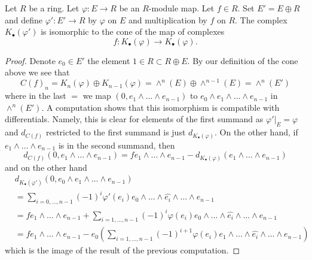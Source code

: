 \begin{lemma}
\label{lemma-cone-koszul-abstract}
Let $R$ be a ring. Let $\varphi : E \to R$ be an $R$-module map.
Let $f \in R$. Set $E' = E \oplus R$ and define $\varphi' : E' \to R$
by $\varphi$ on $E$ and multiplication by $f$ on $R$.
The complex $K_\bullet(\varphi')$ is isomorphic to the
cone of the map of complexes
$$
f :
K_\bullet(\varphi)
\longrightarrow
K_\bullet(\varphi).
$$
\end{lemma}

\begin{proof}
Denote $e_0 \in E'$ the element $1 \in R \subset R \oplus E$.
By our definition of the cone above we see that
$$
C(f)_n = K_n(\varphi) \oplus K_{n - 1}(\varphi) =
\wedge^n(E) \oplus \wedge^{n - 1}(E) = \wedge^n(E')
$$
where in the last $=$ we map $(0, e_1 \wedge \ldots \wedge e_{n - 1})$
to $e_0 \wedge e_1 \wedge \ldots \wedge e_{n - 1}$ in $\wedge^n(E')$.
A computation shows that this isomorphism is compatible with
differentials. Namely, this is clear for elements of the first
summand as $\varphi'|_E = \varphi$ and $d_{C(f)}$ restricted to
the first summand is just $d_{K_\bullet(\varphi)}$.
On the other hand, if $e_1 \wedge \ldots \wedge e_{n - 1}$
is in the second summand, then
$$
d_{C(f)}(0, e_1 \wedge \ldots \wedge e_{n - 1}) =
fe_1 \wedge \ldots \wedge e_{n - 1}
- d_{K_\bullet(\varphi)}(e_1 \wedge \ldots \wedge e_{n - 1})
$$
and on the other hand
\begin{align*}
& d_{K_\bullet(\varphi')}(0, e_0 \wedge e_1 \wedge \ldots \wedge e_{n - 1}) \\
& =
\sum\nolimits_{i = 0, \ldots, n - 1}
(-1)^i \varphi'(e_i)e_0 \wedge \ldots \wedge \widehat{e_i}
\wedge \ldots \wedge e_{n - 1} \\
& =
fe_1 \wedge \ldots \wedge e_{n - 1} +
\sum\nolimits_{i = 1, \ldots, n - 1}
(-1)^i \varphi(e_i)e_0 \wedge \ldots \wedge \widehat{e_i}
\wedge \ldots \wedge e_{n - 1} \\
& =
fe_1 \wedge \ldots \wedge e_{n - 1} -
e_0 \left(\sum\nolimits_{i = 1, \ldots, n - 1}
(-1)^{i + 1} \varphi(e_i)e_1 \wedge \ldots \wedge \widehat{e_i}
\wedge \ldots \wedge e_{n - 1}\right)
\end{align*}
which is the image of the result of the previous computation.
\end{proof}
